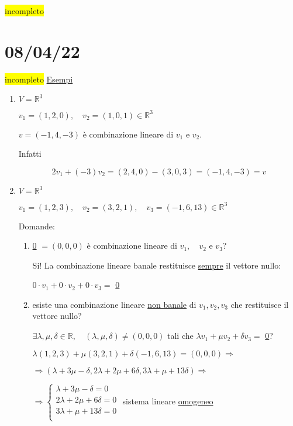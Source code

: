 \documentclass{article}
\newcommand{\hl}[1]{\colorbox{yellow}{#1}}
\newcommand{\ul}[1]{\underline{#1}}
\newcommand{\R}{\mathbb{R}}
\begin{document}
\hl{incompleto}
\section{08/04/22}
\hl{incompleto}
\ul{Esempi}
\begin{enumerate}
	\item $V=\R^3$

	      $v_1=(1,2,0),\quad v_2=(1,0,1)\in\R^3$

	      $v=(-1,4,-3)$ è combinazione lineare di $v_1$ e $v_2$.

	      Infatti

	      $$2v_1+(-3)v_2=(2,4,0)-(3,0,3)=(-1,4,-3)=v$$
	\item $V=\R^3$

	      $v_1=(1,2,3),\quad v_2=(3,2,1),\quad v_3=(-1,6,13)\in\R^3$

	      Domande:
	      \begin{enumerate}
		      \item \ul{0} $=(0,0,0)$ è combinazione lineare di $v_1,\quad v_2$ e $v_3$?

		            Si! La combinazione lineare banale restituisce \ul{sempre} il vettore nullo:

		            $0\cdot v_1+0\cdot v_2+0\cdot v_3=$ \ul{0}

		      \item esiste una combinazione lineare \ul{non banale} di $v_1,v_2,v_3$ che restituisce il vettore nullo?

		            $\exists\lambda,\mu,\delta\in\R,\quad(\lambda,\mu,\delta)\not=(0,0,0)$ tali che $\lambda v_1+\mu v_2+\delta v_3=$ \ul{0}?

		            $\lambda(1,2,3)+\mu(3,2,1)+\delta(-1,6,13)=(0,0,0)\Rightarrow$

		            $\Rightarrow(\lambda+3\mu-\delta,2\lambda+2\mu+6\delta,3\lambda+\mu+13\delta)\Rightarrow$

		            $\Rightarrow
			            \begin{cases}
				            \lambda+3\mu-\delta=0   \\
				            2\lambda+2\mu+6\delta=0 \\
				            3\lambda+\mu+13\delta=0 \\
			            \end{cases}$ sistema lineare \ul{omogeneo}


\end{enumerate}
\end{enumerate}
\end{document}
